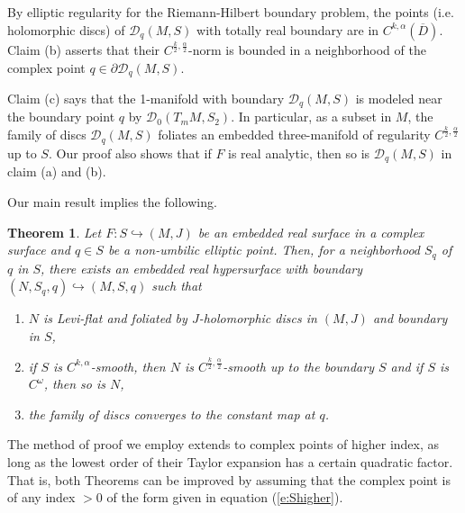 \documentclass{amsart}
\newtheorem{theorem}{Theorem}
\begin{document}
By elliptic regularity for the Riemann-Hilbert boundary problem, the  points (i.e. holomorphic discs) of ${\mathcal D}_ q(M, S)$ with totally real boundary are in $C^{k,\alpha}(\overline D)$. Claim (b) asserts that their $C^{\frac{k}{2},\frac{\alpha}{2}}$-norm is bounded in a neighborhood of the complex point
$ q \in \partial{\mathcal D}_ q(M, S)$.

Claim (c) says that the 1-manifold with boundary ${\mathcal D}_ q(M, S)$ is modeled near the boundary point $q$ by ${\mathcal D}_0(T_m M,S_2)$. In particular, as a subset in $M$,  the family of discs ${\mathcal D}_ q(M, S)$ foliates an embedded three-manifold of regularity $C^{\frac{k}{2},\frac{\alpha}{2}}$ up to $S$. Our proof also shows that if $F$ is real analytic, then so is  ${\mathcal D}_ q(M, S)$ in claim (a) and (b).

Our main result implies the following.
\\
\begin{theorem}\label{t:2}
Let $F:  S\hookrightarrow (M,J)$ be an embedded real surface in a complex surface and $ q\in  S$ be a non-umbilic elliptic point. Then, for a neighborhood $S_ q$ of $q$ in $S$, there exists an embedded real hypersurface with boundary $ (N,   S_ q , q)\hookrightarrow (M,  S , q)$ such that
 \begin{enumerate}
\item[(a)] $N$ is Levi-flat and foliated by $J$-holomorphic discs in $(M,J)$ and boundary in $  S$,
\item[(b)] if $S$ is $C^{k,\alpha}$-smooth, then $N$ is $C^{\frac{k}{2}, \frac{\alpha}{2}}$-smooth up to the boundary $S$ and if 
$S$ is  $ C^{\omega}$,  then so is $N$,
\item[(c)] the family of discs converges to the constant map at $q$.
\end{enumerate}
\end{theorem}

The method of proof we employ extends to complex points of higher index, as long as the lowest order of their Taylor expansion has a certain quadratic factor. That is, both Theorems can be improved by assuming that the complex point is of any index $>0$ of the form given in equation (\ref{e:Shigher}).  
\end{document}
